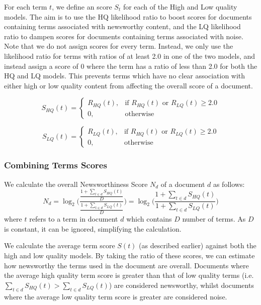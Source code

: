 For each term \(t\), we define an score \(S_t\) for each of the High and Low quality models. The aim is to use the HQ likelihood ratio to boost scores for documents containing terms associated with newsworthy content, and the LQ likelihood ratio to dampen scores for documents containing terms associated with noise.
Note that we do not assign scores for every term.
Instead, we only use the likelihood ratio for terms with ratios of at least 2.0 in one of the two models, and instead assign a score of 0 where the term has a ratio of less than 2.0 for both the HQ and LQ models.
This prevents terms which have no clear association with either high or low quality content from affecting the overall score of a document.

\begin{displaymath}
	S_{HQ}(t) =
	\begin{cases}
    R_{HQ}(t) ,& \text{if } R_{HQ}(t) \text{ or } R_{LQ}(t) \geq 2.0\\
    0,              & \text{otherwise}
	\end{cases}
\end{displaymath}

\begin{displaymath}
	S_{LQ}(t) =
	\begin{cases}
    R_{LQ}(t),& \text{if } R_{HQ}(t) \text{ or } R_{LQ}(t) \geq 2.0\\
    0,              & \text{otherwise}
	\end{cases}
\end{displaymath}

\subsubsection{Combining Terms Scores}
We calculate the overall Newsworthiness Score \(N_d\) of a document \(d\) as follows:
\begin{displaymath}
	N_d =
	\log_2\Bigg({\frac{
		\frac{
			1 + \sum_{t \in d}{S_{HQ}(t)}
		}{
			D
		}
	}{
		\frac{
			1 + \sum_{t \in d}{S_{LQ}(t)}
		}{
			D
		}
	}}\Bigg)
	=
	\log_2\bigg({\frac{
		1 + \sum_{t \in d}{S_{HQ}(t)}
	}{
		1 + \sum_{t \in d}{S_{LQ}(t)}
	}}\bigg)
\end{displaymath}
where \(t\) refers to a term in document \(d\) which contains \(D\) number of terms. As \(D\) is constant, it can be ignored, simplifying the calculation.

We calculate the average term score \(S(t)\) (as described earlier) against both the high and low quality models.
By taking the ratio of these scores, we can estimate how newsworthy the terms used in the document are overall.
Documents where the average high quality term score is greater than that of low quality terms (i.e. \( \sum_{t \in d}{S_{HQ}(t)} > \sum_{t \in d}{S_{LQ}(t)} \)) are considered newsworthy, whilst documents where the average low quality term score is greater are considered noise.

